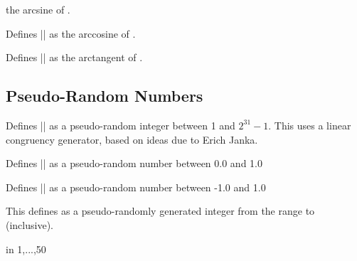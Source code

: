 \begin{command}{}
	the arcsine of .
\end{command}

\begin{command}{}
	Defines |\pgfmathresult| as the arccosine of .
\end{command}

\begin{command}{}
 	Defines |\pgfmathresult| as the arctangent of .
\end{command}



\subsection{Pseudo-Random Numbers}

\label{pgfmath-random}


\begin{command}{\pgfmathgeneratepseudorandomnumber}
	Defines |\pgfmathresult| as a pseudo-random integer between 1 and 
	$2^{31}-1$. This uses a linear congruency generator, based on ideas
	due to Erich Janka.
\end{command}

\begin{command}{\pgfmathrnd}
	Defines |\pgfmathresult| as a pseudo-random number between 0.0 and 1.0
\end{command}

\begin{command}{\pgfmathrand}
	Defines |\pgfmathresult| as a pseudo-random number between -1.0 and 1.0
\end{command}

\begin{command}{\pgfmathrandominteger{}}
	This defines  as a pseudo-randomly generated integer from 
	the range  to  (inclusive).
	
\begin{codeexample}[]
\begin{pgfpicture}
   \foreach \x in {1,...,50}{
      \color{blue!40!white}
   }	  
\end{pgfpicture}
\end{codeexample}
\end{command}

